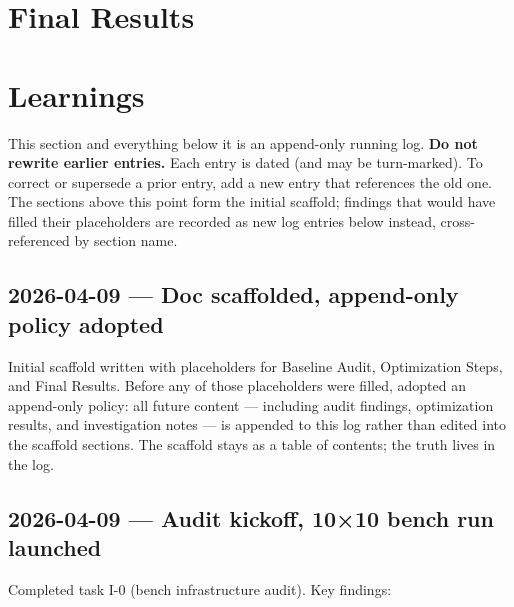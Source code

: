 \section{Final Results}\label{record-422-final-results}

\section{Learnings}\label{record-422-learnings}

This section and everything below it is an append-only running log. \textbf{Do not rewrite earlier entries.} Each entry is dated (and may be turn-marked). To correct or supersede a prior entry, add a new entry that references the old one. The sections above this point form the initial scaffold; findings that would have filled their placeholders are recorded as new log entries below instead, cross-referenced by section name.

\subsection{2026-04-09 --- Doc scaffolded, append-only policy adopted}\label{record-422-doc-scaffolded-append-only-policy-adopted}

Initial scaffold written with placeholders for Baseline Audit, Optimization Steps, and Final Results. Before any of those placeholders were filled, adopted an append-only policy: all future content --- including audit findings, optimization results, and investigation notes --- is appended to this log rather than edited into the scaffold sections. The scaffold stays as a table of contents; the truth lives in the log.

\subsection{2026-04-09 --- Audit kickoff, 10×10 bench run launched}\label{record-422-audit-kickoff-1010-bench-run-launched}

Completed task I-0 (bench infrastructure audit). Key findings:

